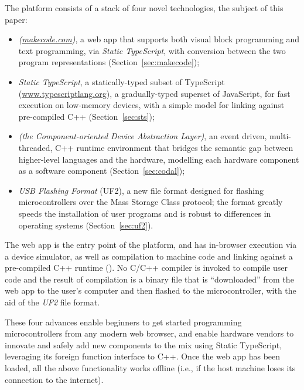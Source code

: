 The platform consists of a stack of four novel technologies, the subject of
this paper:
\begin{itemize}
\item \emph{\MC (\href{https://makecode.com}{makecode.com})}, a web app that supports both visual block programming and text programming,
via \emph{Static TypeScript}, with conversion between the two program representations (Section~\ref{sec:makecode});

\item \emph{Static TypeScript}, a statically-typed subset of TypeScript (\url{www.typescriptlang.org}),
a gradually-typed superset of JavaScript, for fast execution on low-memory devices, with
a simple model for linking against pre-compiled C++ (Section~\ref{sec:sts});

\item \emph{\CO (the Component-oriented Device Abstraction Layer)}, an event driven, multi-threaded, C++ runtime environment that bridges the semantic gap between higher-level languages and the hardware,
modelling each hardware component as a software component (Section~\ref{sec:codal});

\item \emph{USB Flashing Format} (UF2), a new file format designed for flashing microcontrollers over the Mass Storage
Class protocol; the format greatly speeds the installation of user
programs and is robust to differences in operating systems (Section~\ref{sec:uf2}).
\end{itemize}
The \MC web app is the entry point of the platform, and has in-browser execution via a device simulator, as well as compilation to machine code and linking against a
pre-compiled C++ runtime (\emph{\CON}). No C/C++ compiler is invoked to compile user code and the result of compilation is a binary file that is ``downloaded'' from the web app to the user's
computer and then flashed to the microcontroller, with the aid of the \emph{UF2} file format.

These four advances enable beginners to get started programming microcontrollers from any modern web browser, and enable
hardware vendors to innovate and safely add new components to the mix using Static TypeScript, leveraging its
foreign function interface to C++.
Once the web app has been loaded, all the above functionality works offline (i.e., if the host machine loses its connection
to the internet).

